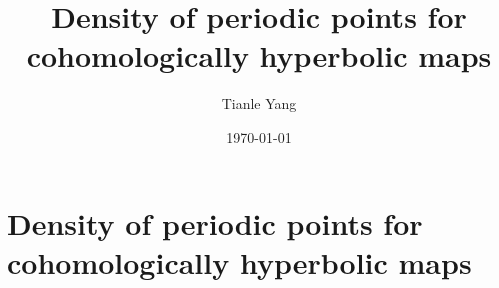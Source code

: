 \documentclass[sectionlevel=section,status=draft]{noteformyself}
\title{Density of periodic points for cohomologically hyperbolic maps}
\author{Tianle Yang}
\date{\today}
\begin{document}
    \maketitle

    \section[
      status=draft,
      tag=00000,
      label=\labelNFM{sec:periodic-points-and-orbits:density-of-periodic-points-for-cohomologically-hyperbolic-maps}
    ]{Density of periodic points for cohomologically hyperbolic maps}

    

\end{document}
